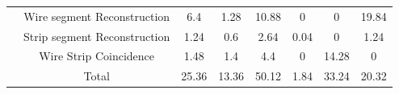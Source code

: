 \begin{table}[]
\begin{tabular}{|c|c|c|c|c|c|c|c|}
                                                                                & Wire segment Reconstruction  & 6.4                                                       & 1.28                                                      & 10.88                                                    & 0                                                                 & 0                                                      & 19.84                                                  \\ \cline{2-8} 
                                                                                & Strip segment Reconstruction & 1.24                                                      & 0.6                                                       & 2.64                                                     & 0.04                                                              & 0                                                      & 1.24                                                   \\ \cline{2-8} 
                                                                                & Wire Strip Coincidence       & 1.48                                                      & 1.4                                                       & 4.4                                                      & 0                                                                 & 14.28                                                  & 0                                                      \\ \cline{2-8} 
                                                                                & Total                        & 25.36                                                     & 13.36                                                     & 50.12                                                    & 1.84                                                              & 33.24                                                  & 20.32                                                  \\ \hline
    \end{tabular}
\end{table}